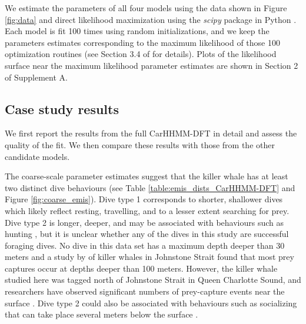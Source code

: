 We estimate the parameters of all four models using the data shown in Figure \ref{fig:data} and direct likelihood maximization using the \textit{scipy} package in Python \citep{Virtanen:2019}. Each model is fit 100 times using random initializations, and
we keep the parameters estimates corresponding to the maximum likelihood of those 100 optimization routines (see Section 3.4 of \citet{Zucchini:2016} for details). Plots of the likelihood surface near the maximum likelihood parameter estimates are shown in Section 2 of Supplement A. 

\subsection{Case study results}

We first report the results from the full CarHHMM-DFT in detail and assess the quality of the fit. We then compare these results with those from the other candidate models.

The coarse-scale parameter estimates suggest that the killer whale has at least two distinct dive behaviours (see Table \ref{table:emis_dists_CarHHMM-DFT} and Figure \ref{fig:coarse_emis}). 
Dive type 1 corresponds to shorter, shallower dives which likely reflect resting, travelling, and to a lesser extent searching for prey.
Dive type 2 is longer, deeper, and may be associated with behaviours such as hunting  \citep{Tennessen:2019b}, but it is unclear whether any of the dives in this study are successful foraging dives. No dive in this data set has a maximum depth deeper than 30 meters and a study by \citet{Wright:2017} of killer whales in Johnstone Strait found that most prey captures occur at depths deeper than 100 meters. However, the killer whale studied here was tagged north of Johnstone Strait in Queen Charlotte Sound, and researchers have observed significant numbers of prey-capture events near the surface \citep{Fortune:2020}. Dive type 2 could also be associated with behaviours such as socializing that can take place several meters below the surface \citep{Tennessen:2019b}.

